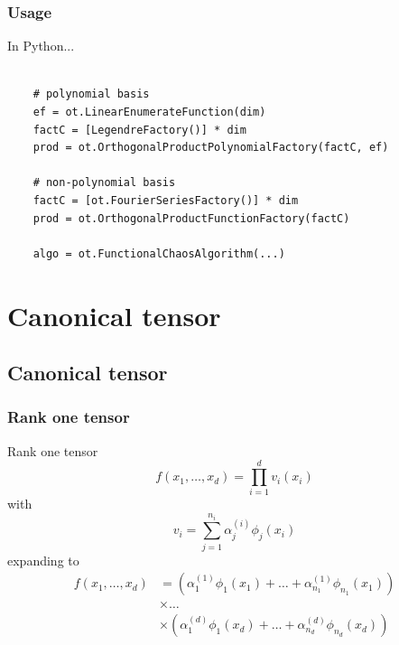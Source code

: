 \documentclass{beamer}
\begin{document}
\begin{frame}[containsverbatim]
  \frametitle{Usage}
  \begin{block}{In Python...}
    \begin{lstlisting}

    # polynomial basis
    ef = ot.LinearEnumerateFunction(dim)
    factC = [LegendreFactory()] * dim
    prod = ot.OrthogonalProductPolynomialFactory(factC, ef)

    # non-polynomial basis
    factC = [ot.FourierSeriesFactory()] * dim
    prod = ot.OrthogonalProductFunctionFactory(factC)

    algo = ot.FunctionalChaosAlgorithm(...)
    \end{lstlisting}
  \end{block}
\end{frame}

\section[Canonical tensor]{Canonical tensor}

\subsection[Canonical tensor]{Canonical tensor}
\begin{frame}
  \frametitle{Rank one tensor}
  \begin{block}{Rank one tensor}
  $$
  f(x_1, \dots, x_d) = \prod_{i=1}^d v_i (x_i)
  $$
  with
  $$
  v_i = \sum_{j=1}^{n_i} \alpha_j^{(i)} \phi_j(x_i)
  $$
  expanding to
  \begin{align*}
  f(x_1, \dots, x_d) & = (\alpha_1^{(1)} \phi_1(x_1)+\dots+\alpha_{n_1}^{(1)} \phi_{n_1}(x_1)) \\
                & \times \dots \\
                & \times (\alpha_1^{(d)} \phi_1(x_d)+\dots+\alpha_{n_d}^{(d)} \phi_{n_d}(x_d))
  \end{align*}

  \end{block}

\end{frame}
\end{document}
